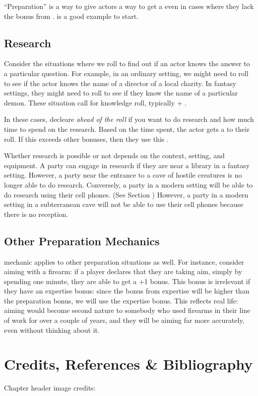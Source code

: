 ``Preparation'' is a way to give actors a way to get a 
even in cases where they lack the bonus from .
 is a good example to start.

\subsection{Research}
\label{subsec:research_mechanic}

\begin{marginNote}
	
\end{marginNote}

Consider the situations where we roll to find out if an actor knows the answer
to a particular question. For example, in an ordinary setting, we might need
to roll to see if the actor knows the name of a director of a local charity.
In fantasy settings, they might need to roll to see if they know the name of
a particular demon. These situation call for knowledge roll, typically
 + .

In these cases, decleare \emph{ahead of the roll} if you want to do research and how
much time to spend on the research. Based on the time spent, the actor gets a 
to their roll. If this  exceeds other bonuses, then they use this
.

Whether research is possible or not depends on the context, setting, and equipment.
A party can engage in research if they are near a library in a fantasy setting.
However, a party near the entrance to a cave of hostile creatures is no longer able to do research.
Conversely, a party in a modern setting will be able to do research using their cell phones. (See Section )
However, a party in a modern setting in a subterranean cave will not be able to use their cell phones because there is no reception.


\subsection{Other Preparation Mechanics}

 mechanic applies to other preparation situations as well.
For instance, consider aiming with a firearm: if a player declares that they are taking aim,
simply by spending one minute, they are able to get a +1 bonus.
This bonus is irrelevant if they have an expertise bonus: since the bonus from expertise
will be higher than the preparation bonus, we will use the expertise bonus.
This reflects real life: aiming would become second nature to somebody who used firearms
in their line of work for over a couple of years, and they will be aiming far more accurately,
even without thinking about it.

\section*{Credits, References \& Bibliography}

Chapter header image credits: \cite{dice_image}

\printbibliography[heading=none]
